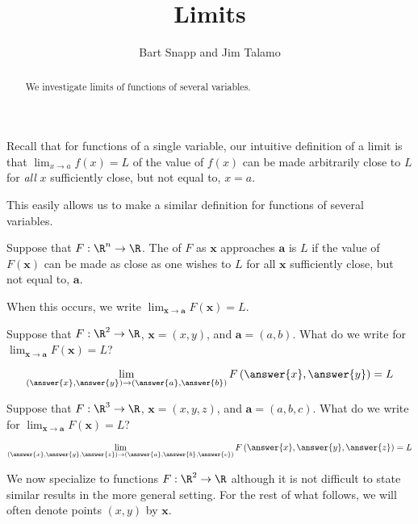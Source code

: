 \documentclass{ximera}
\author{Bart Snapp and Jim Talamo}
\title[Dig-In:]{Limits}
\newcommand{\point}[1]{\left(#1\right)} %
\newcommand{\pt}[1]{\mathbf{#1}} %
\newcommand{\Lim}[2]{\lim_{#1 \to #2}}
\begin{document}
\begin{abstract}
We investigate limits of functions of several variables.
\end{abstract}
\maketitle

Recall that for functions of a single variable, our intuitive definition of a limit is that $\Lim{x}{a} f(x) = L$ of the value of $f(x)$ can be made arbitrarily close to $L$ for \emph{all} $x$ sufficiently close, but not equal to, $x=a$.

This easily allows us to make a similar definition for functions of several variables.

\begin{definition}
 Suppose that $F:\R^n\to\R$.  The  of $F$ as $\pt{x}$ approaches $\pt{a}$ is $L$ if the value of $F(\pt{x})$ can be made as close as one wishes to $L$ for all $\pt{x}$ sufficiently close, but not equal to, $\pt{a}$.
 
 When this occurs, we write $\lim_{\pt{x}\to \pt{a}} F(\pt{x}) = L$.  
\end{definition}

\begin{question}
  Suppose that $F:\R^2\to\R$, $\pt{x} = \point{x,y}$, and $\pt{a} =
  \point{a,b}$. What do we write for $\lim_{\pt{x}\to \pt{a}}
  F(\pt{x}) = L$?
  \begin{prompt}
    \[
    \lim_{\point{\answer{x},\answer{y}}\to \point{\answer{a},\answer{b}}} F\left(\answer{x},\answer{y}\right) = L
    \]
  \end{prompt}
  \begin{question}
    Suppose that $F:\R^3\to\R$, $\pt{x} = \point{x,y,z}$, and
    $\pt{a} = \point{a,b,c}$. What do we write for $\lim_{\pt{x}\to
      \pt{a}} F(\pt{x}) = L$?
    \begin{prompt}
      \[
      \lim_{\point{\answer{x},\answer{y},\answer{z}}\to \point{\answer{a},\answer{b},\answer{c}}} F\left(\answer{x},\answer{y},\answer{z}\right) = L
      \]
    \end{prompt}
  \end{question}
\end{question}

We now specialize to functions $F:\R^2 \to \R$ although it is not difficult to state similar results in the more general setting.  For the rest of what follows, we will often denote points $\point{x,y}$ by $\pt{x}$.
\end{document}
